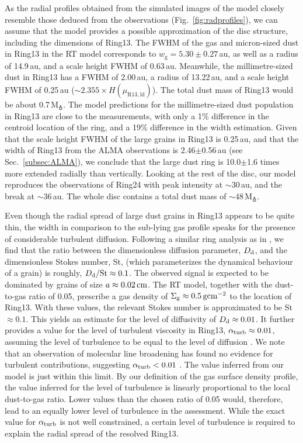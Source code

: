 \documentclass[fleqn,usenatbib,useAMS]{mnras}
\begin{document}
As the radial profiles obtained from the simulated images of the model closely resemble those deduced from the observations (Fig.~\ref{fig:radprofiles}), we can assume that the model provides a possible approximation of the disc structure, including the dimensions of Ring13. The FWHM of the gas and micron-sized dust in Ring13 in the RT model corresponds to $w_\mathrm{g} = 5.30\pm0.27$\,au, as well as a radius of 14.9\,au, and a scale height FWHM of 0.63\,au. Meanwhile, the millimetre-sized dust in Ring13 has a FWHM of 2.00\,au, a radius of 13.22\,au, and a scale height FWHM of 0.25\,au ($\sim2.355\times H(\mu_\mathrm{R13,ld})$). The total dust mass of Ring13 would be about 0.7\,M$_{\earth}$. The model predictions for the millimetre-sized dust population in Ring13 are close to the measurements, with only a 1\% difference in the centroid location of the ring, and a 19\% difference in the width estimation. Given that the scale height FWHM of the large grains in Ring13 is 0.25\,au, and that the width of Ring13 from the ALMA observations is 2.46$\pm$0.56\,au (see Sec.~\ref{subsec:ALMA}), we conclude that the large dust ring is 10.0$\pm$1.6 times more extended radially than vertically. Looking at the rest of the disc, our model reproduces the observations of Ring24 with peak intensity at $\sim$30\,au, and the break at $\sim$36\,au. The whole disc contains a total dust mass of $\sim$48\,M$_{\earth}$.

Even though the radial spread of large dust grains in Ring13 appears to be quite thin, the width in comparison to the sub-lying gas profile speaks for the presence of considerable turbulent diffusion. Following a similar ring analysis as in \citet{2018ApJ...869L..46D}, we find that the ratio between the dimensionless diffusion parameter, $D_{\rm d}$, and the dimensionless Stokes number, St, (which parameterizes the dynamical behaviour of a grain) is roughly, $D_{\rm d}/{\rm St}\approx 0.1$. The observed signal is expected to be dominated by grains of size $a\approx 0.02\,{\rm cm}$. The RT model, together with the dust-to-gas ratio of 0.05, prescribe a gas density of $\Sigma_{\rm g} \approx 0.5\,{\rm g}{\rm cm}^{-2}$ to the location of Ring13. With these values, the relevant Stokes number is approximated to be St$\approx 0.1$. This yields an estimate for the level of diffusivity of $D_{\rm d}\approx 0.01$. It further provides a value for the level of turbulent viscosity in Ring13, $\alpha_{\rm turb}\approx 0.01$, assuming the level of turbulence to be equal to the level of diffusion \citep{2007Icar..192..588Y}. We note that an observation of molecular line broadening has found no evidence for turbulent contributions, suggesting $\alpha_{\rm turb}<0.01$ \citep{Flaherty_2020}. The value inferred from our model is just within this limit. By our definition of the gas surface density profile, the value inferred for the level of turbulence is linearly proportional to the local dust-to-gas ratio. Lower values than the chosen ratio of 0.05 would, therefore, lead to an equally lower level of turbulence in the assessment. While the exact value for $\alpha_{\rm turb}$ is not well constrained, a certain level of turbulence is required to explain the radial spread of the resolved Ring13.
\end{document}
